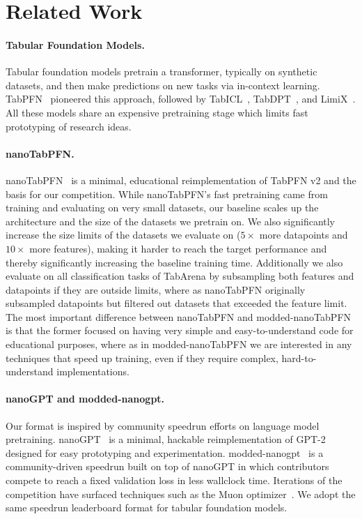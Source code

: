 \documentclass{article}
\theoremstyle{plain}
\theoremstyle{definition}
\theoremstyle{remark}
\begin{document}
\section{Related Work}

\paragraph{Tabular Foundation Models.}
Tabular foundation models pretrain a transformer, typically on synthetic datasets, and then make predictions on new tasks via in-context learning.
TabPFN~\citep{hollmann2023tabpfn,hollmann2025tabpfnv2,grinsztajn2026tabpfn25advancingstateart} pioneered this approach,
followed by TabICL~\citep{qu2025tabicl,qu2026tabiclv2}, TabDPT~\citep{ma2025tabdpt}, and LimiX~\citep{zhang2025limix}.
All these models share an expensive pretraining stage which limits fast prototyping of research ideas.

\paragraph{nanoTabPFN.}
nanoTabPFN~\citep{pfefferle2025nanotabpfn} is a minimal, educational reimplementation of TabPFN v2 and the basis for our competition.
While nanoTabPFN's fast pretraining came from training and evaluating on very small datasets, our baseline scales up the  architecture and the size of the datasets we pretrain on.
We also significantly increase the size limits of the datasets we evaluate on ($5\times$ more datapoints and $10\times$ more features), making it harder to reach the target performance and thereby significantly increasing the baseline training time.
Additionally we also evaluate on all classification tasks of TabArena by subsampling both features and datapoints if they are outside limits, where as nanoTabPFN originally subsampled datapoints but filtered out datasets that exceeded the feature limit.
The most important difference between nanoTabPFN and modded-nanoTabPFN is that the former focused on having very simple and easy-to-understand code for educational purposes, where as in modded-nanoTabPFN we are interested in any techniques that speed up training, even if they require complex, hard-to-understand implementations.

\paragraph{nanoGPT and modded-nanogpt.}
Our format is inspired by community speedrun efforts on language model pretraining.
nanoGPT~\citep{karpathy2023nanogpt} is a minimal, hackable reimplementation of GPT-2 designed for easy prototyping and experimentation.
modded-nanogpt~\citep{moddednanogpt} is a community-driven speedrun built on top of nanoGPT in which contributors compete to reach a fixed validation loss in less wallclock time.
Iterations of the competition have surfaced techniques such as the Muon optimizer~\citep{jordan2024muon}.
We adopt the same speedrun leaderboard format for tabular foundation models.
\end{document}
